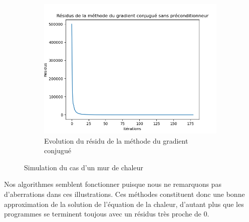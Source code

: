 \documentclass{article}
\begin{document}
\begin{figure}[ht]
\begin{subfigure}{0.3\textwidth}
    \centering
    \includegraphics[width=\linewidth]{Chaleur_2c.png}
    \caption{Evolution du résidu de la méthode du gradient conjugué}
    \label{subfig:heat_wall_residus}
  \end{subfigure}
  \caption{Simulation du cas d'un mur de chaleur}
  \label{fig:heat_wall}
\end{figure}

Nos algorithmes semblent fonctionner puisque nous ne remarquons pas d'aberrations dans ces illustrations. Ces méthodes constituent donc une bonne approximation de la solution de l'équation de la chaleur, d'autant plus que les programmes se terminent toujous avec un résidus très proche de 0.
\end{document}
